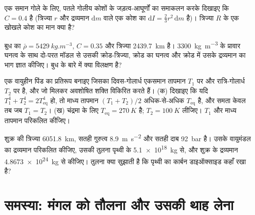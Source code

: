 \begin{exercise}[$\star\star$]\label{exo:b1:comparative-planetology:9}
एक समान गोले के लिए, पतले गोलीय कोशों के जड़त्व-आघूर्णों का समाकलन करके दिखाइए कि $C = 0.4$ है (त्रिज्या
$r$ और द्रव्यमान $\mathrm dm$ वाले एक कोश का $\mathrm dI = \tfrac23 r^2\,\mathrm dm$ है)। त्रिज्या $R$ के
एक खोखले कोश का मान क्या है?
\end{exercise}

\begin{exercise}[$\star\star\star$]\label{exo:b1:comparative-planetology:10}
बुध का $\bar\rho = \qty{5429}{kg.m^{-3}}$, $C = 0.35$ और त्रिज्या \qty{2439.7}{km} है। \qty{3300}{kg.m^{-3}}
के प्रावार घनत्व के साथ दो-परत मॉडल से उसकी क्रोड-त्रिज्या, क्रोड का घनत्व और क्रोड में उसके द्रव्यमान का
भाग ज्ञात कीजिए। बुध के बारे में क्या विलक्षण है?
\end{exercise}

\begin{exercise}[$\star\star\star$]\label{exo:b1:comparative-planetology:11}
एक वायुहीन पिंड का प्रतिरूप बनाइए जिसका दिवस-गोलार्ध एकसमान तापमान $T_1$ पर और रात्रि-गोलार्ध $T_2$
पर है, और जो मिलकर अवशोषित शक्ति विकिरित करते हैं। (क) दिखाइए कि यदि $T_1^4 + T_2^4 = 2T_\mathrm{eq}^4$
हो, तो माध्य तापमान $(T_1 + T_2)/2$ अधिक-से-अधिक $T_\mathrm{eq}$ है, और समता केवल तब जब
$T_1 = T_2$। (ख) चंद्रमा के लिए $T_\mathrm{eq} = \qty{270}{K}$ है; $T_2 = \qty{100}{K}$ लीजिए। $T_1$ और माध्य
तापमान परिकलित कीजिए।
\end{exercise}

\begin{exercise}[$\star\star\star$]\label{exo:b1:comparative-planetology:12}
शुक्र की त्रिज्या \qty{6051.8}{km}, सतही गुरुत्व \qty{8.9}{m.s^{-2}} और सतही दाब \qty{92}{bar} है। उसके
वायुमंडल का द्रव्यमान परिकलित कीजिए, उसकी तुलना पृथ्वी के \qty{5.1e18}{kg} से, और शुक्र के
द्रव्यमान \qty{4.8673e24}{kg} से कीजिए। तुलना क्या सुझाती है कि पृथ्वी का कार्बन डाइऑक्साइड कहाँ रखा है?
\end{exercise}

\section{समस्या: मंगल को तौलना और उसकी थाह लेना}

